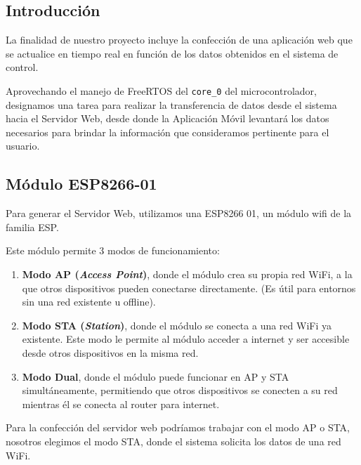             \subsection{Introducción}
                La finalidad de nuestro proyecto incluye la confección de una aplicación web que se actualice en tiempo real en función de los datos obtenidos en el sistema de control.\par
                Aprovechando el manejo de FreeRTOS del \texttt{core\_0} del microcontrolador, designamos una tarea para realizar la transferencia de datos desde el sistema hacia el Servidor Web, desde donde la Aplicación Móvil levantará los datos necesarios para brindar la información que consideramos pertinente para el usuario.\par
            
            \subsection{Módulo ESP8266-01}
                Para generar el Servidor Web, utilizamos una ESP8266 01, un módulo wifi de la familia ESP.\par
                Este módulo permite 3 modos de funcionamiento:\par
                
                \begin{enumerate}
                \setlength{\itemindent}{1.5em}
                    \item \textbf{Modo AP (\textit{Access Point})}, donde el módulo crea su propia red WiFi, a la que otros dispositivos pueden conectarse directamente. (Es útil para entornos sin una red existente u offline).
                    \item \textbf{Modo STA (\textit{Station})}, donde el módulo se conecta a una red WiFi ya existente. Este modo le permite al módulo acceder a internet y ser accesible desde otros dispositivos en la misma red.
                    \item \textbf{Modo Dual}, donde el módulo puede funcionar en AP y STA simultáneamente, permitiendo que otros dispositivos se conecten a su red mientras él se conecta al router para internet.
                \end{enumerate}
                
                Para la confección del servidor web podríamos trabajar con el modo AP o STA, nosotros elegimos el modo STA, donde el sistema solicita los datos de una red WiFi.\par
                

